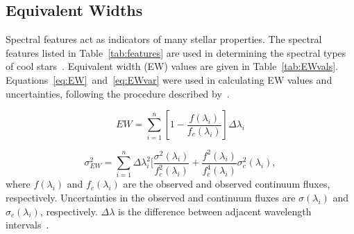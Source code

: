 \subsection{Equivalent Widths}

Spectral features act as indicators of many stellar properties.  The 
spectral features listed in Table~\ref{tab:features} 
are used in determining the spectral types of cool 
stars~\cite{Rayner_2009}.  Equivalent width (EW) 
values are given in Table~\ref{tab:EWvals}.  
Equations~\ref{eq:EW}~and~\ref{eq:EWvar} were used in calculating EW values 
and uncertainties, following the procedure described by~\cite{Cushing_2005}. 


\begin{equation}\label{eq:EW}
	EW = \sum_{i=1}^{n} [1 - \frac{f(\lambda_{i})}{f_{c}(\lambda_{i})}] \Delta\lambda_{i}
\end{equation}

\begin{equation}\label{eq:EWvar}
	\sigma_{EW}^{2} = \sum_{i=1}^{n} \Delta\lambda_{i}^{2} [\frac{\sigma^{2}(\lambda_{i})}{f_{c}^{2}(\lambda_{i})} + \frac{f^{2}(\lambda_{i})}{f_{c}^{4}(\lambda_{i})}\sigma_{c}^{2}(\lambda_{i}),
\end{equation}
where $f(\lambda_{i})$ and $f_{c}(\lambda_{i})$ are the observed 
and observed continuum fluxes, respectively.  Uncertainties in the 
observed and continuum fluxes are $\sigma(\lambda_{i})$ and 
$\sigma_{c}(\lambda_{i})$, respectively.  $\Delta\lambda$ is the 
difference between adjacent wavelength intervals~\cite{Sembach_1992}.




